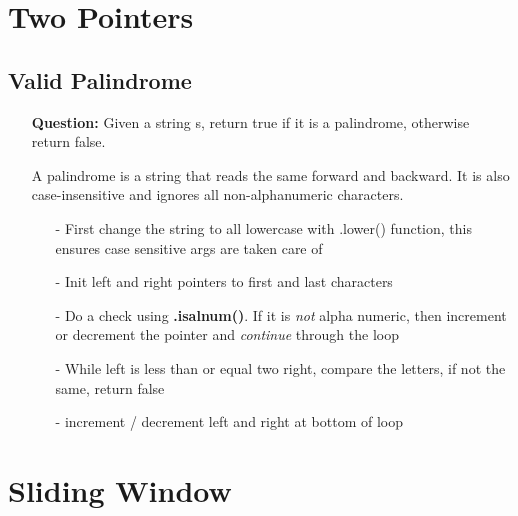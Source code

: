 \documentclass[12pt]{article}
\begin{document}
\section{Two Pointers}
\subsection{Valid Palindrome}
\begin{enumerate}
  \item[] \textbf{Question:} Given a string s, return true if it is a palindrome, otherwise return false.

A palindrome is a string that reads the same forward and backward. It is also case-insensitive and ignores all non-alphanumeric characters.
    \begin{enumerate}
      \item[-] First change the string to all lowercase with .lower() function, this ensures case sensitive args are taken care of
      \item[-] Init left and right pointers to first and last characters
      \item[-] Do a check using \textbf{.isalnum()}. If it is \textit{not} alpha numeric, then increment or decrement the pointer and \textit{continue} through the loop
      \item[-] While left is less than or equal two right, compare the letters, if not the same, return false
      \item[-] increment / decrement left and right at bottom of loop
    \end{enumerate}
\end{enumerate}

\section{Sliding Window}
\end{document}
